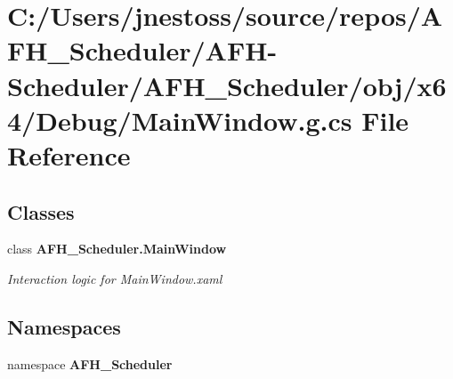 \section{C\+:/\+Users/jnestoss/source/repos/\+A\+F\+H\+\_\+\+Scheduler/\+A\+F\+H-\/\+Scheduler/\+A\+F\+H\+\_\+\+Scheduler/obj/x64/\+Debug/\+Main\+Window.g.\+cs File Reference}
\label{x64_2_debug_2_main_window_8g_8cs}
\subsection*{Classes}
\begin{DoxyCompactItemize}
\item 
class \textbf{ A\+F\+H\+\_\+\+Scheduler.\+Main\+Window}
\begin{DoxyCompactList}\small\item\em Interaction logic for Main\+Window.\+xaml \end{DoxyCompactList}\end{DoxyCompactItemize}
\subsection*{Namespaces}
\begin{DoxyCompactItemize}
\item 
namespace \textbf{ A\+F\+H\+\_\+\+Scheduler}
\end{DoxyCompactItemize}
